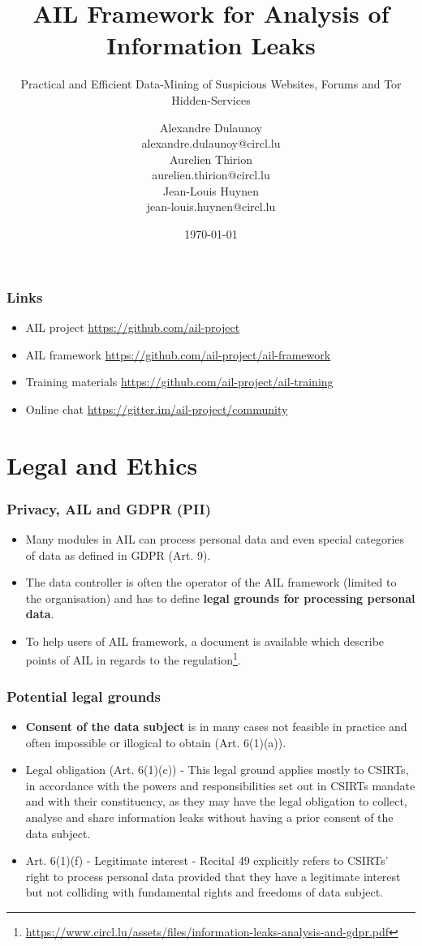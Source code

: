 \documentclass{beamer}
\author{\Large{Alexandre Dulaunoy}\\ \scriptsize{alexandre.dulaunoy@circl.lu}\\ \large{Aurelien Thirion}\\ \scriptsize{aurelien.thirion@circl.lu}\\ \large{Jean-Louis Huynen}\\ \scriptsize{jean-louis.huynen@circl.lu}\\}
\title{AIL Framework for Analysis of Information Leaks}
\subtitle{Practical and Efficient Data-Mining of Suspicious Websites, Forums and Tor Hidden-Services}
\institute{info@circl.lu}
\date{\today}
\begin{document}
\begin{frame}[t,plain]
\titlepage
\end{frame}


\begin{frame}
\frametitle{Links}
    \begin{itemize}
        \item AIL project \url{https://github.com/ail-project}
        \item AIL framework \url{https://github.com/ail-project/ail-framework}
        \item Training materials \url{https://github.com/ail-project/ail-training}
        \item Online chat \url{https://gitter.im/ail-project/community}
    \end{itemize}
\end{frame}


\section{Legal and Ethics}
\begin{frame}
        \frametitle{Privacy, AIL and GDPR (PII)}
        \begin{itemize}
                \item Many modules in AIL can process personal data and even special categories of data as defined in GDPR (Art. 9).
                \item The data controller is often the operator of the AIL framework (limited to the organisation) and has to define {\bf legal grounds for processing personal data}.
                \item To help users of AIL framework, a document is available which describe points of AIL in regards to the regulation\footnote{\url{https://www.circl.lu/assets/files/information-leaks-analysis-and-gdpr.pdf}}.
        \end{itemize}
\end{frame}

\begin{frame}
        \frametitle{Potential legal grounds}
        \begin{itemize}
                \item {\bf Consent of the data subject} is in many cases not feasible in practice and often impossible or illogical to obtain (Art. 6(1)(a)).
                \item Legal obligation (Art. 6(1)(c)) - This legal ground applies mostly to CSIRTs, in accordance with the powers and responsibilities set out in CSIRTs mandate and with their constituency, as they may have the legal obligation to collect, analyse and share information leaks without having a prior consent of the data subject.
				\item Art. 6(1)(f) - Legitimate interest - Recital 49 explicitly refers to CSIRTs’ right to process personal data provided that they have a legitimate interest but not colliding with fundamental rights and freedoms of data subject.
        \end{itemize}
\end{frame}
\end{document}

